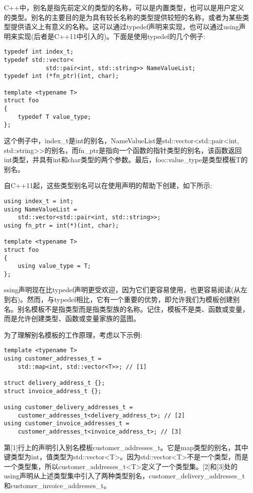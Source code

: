 C++中，别名是指先前定义的类型的名称，可以是内置类型，也可以是用户定义的类型。别名的主要目的是为具有较长名称的类型提供较短的名称，或者为某些类型提供语义上有意义的名称。这可以通过typedef声明来实现，也可以通过using声明来实现(后者是C++11中引入的)。下面是使用typedef的几个例子:

\begin{lstlisting}[style=styleCXX]
typedef int index_t;
typedef std::vector<
			std::pair<int, std::string>> NameValueList;
typedef int (*fn_ptr)(int, char);

template <typename T>
struct foo
{
	typedef T value_type;
};
\end{lstlisting}

这个例子中，index\_t是int的别名，NameValueList是std::vector<std::pair<int, std::string>>的别名，而fn\_ptr是指向一个函数的指针类型的别名，该函数返回int类型，并具有int和char类型的两个参数。最后，foo::value\_type是类型模板T的别名。

自C++11起，这些类型别名可以在使用声明的帮助下创建，如下所示:

\begin{lstlisting}[style=styleCXX]
using index_t = int;
using NameValueList =
	std::vector<std::pair<int, std::string>>;
using fn_ptr = int(*)(int, char);

template <typename T>
struct foo
{
	using value_type = T;
};
\end{lstlisting}

ssing声明现在比typedef声明更受欢迎，因为它们更容易使用，也更容易阅读(从左到右)。然而，与typedef相比，它有一个重要的优势，即允许我们为模板创建别名。别名模板不是指类型而是指类型族的名称。记住，模板不是类、函数或变量，而是允许创建类型、函数或变量家族的蓝图。

为了理解别名模板的工作原理，考虑以下示例:

\begin{lstlisting}[style=styleCXX]
template <typename T>
using customer_addresses_t =
	std::map<int, std::vector<T>>; // [1]
	
struct delivery_address_t {};
struct invoice_address_t {};

using customer_delivery_addresses_t =
	customer_addresses_t<delivery_address_t>; // [2]
using customer_invoice_addresses_t =
	customer_addresses_t<invoice_address_t>; // [3]
\end{lstlisting}

第[1]行上的声明引入别名模板customer\_addresses\_t。它是map类型的别名，其中键类型为int，值类型为std::vector<T>。因为std::vector<T>不是一个类型，而是一个类型集，所以customer\_addresses\_t<T>定义了一个类型集。[2]和[3]处的using声明从上述类型集中引入了两种类型别名，customer\_delivery\_addresses\_t和customer\_invoice\_addresses\_t。

